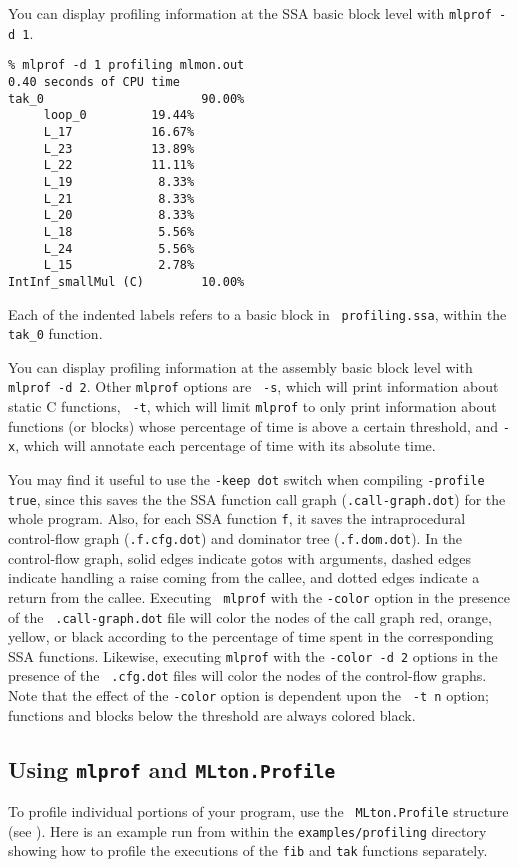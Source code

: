 You can display profiling information at the SSA basic block level
with {\tt mlprof -d 1}.

\begin{verbatim}
% mlprof -d 1 profiling mlmon.out
0.40 seconds of CPU time
tak_0                      90.00%
     loop_0         19.44%       
     L_17           16.67%       
     L_23           13.89%       
     L_22           11.11%       
     L_19            8.33%       
     L_21            8.33%       
     L_20            8.33%       
     L_18            5.56%       
     L_24            5.56%       
     L_15            2.78%       
IntInf_smallMul (C)        10.00%
\end{verbatim}
Each of the indented labels refers to a basic block in {\tt
  profiling.ssa}, within the {\tt tak\_0} function.

You can display profiling information at the assembly basic block
level with {\tt mlprof -d 2}.  Other {\tt mlprof} options are {\tt
  -s}, which will print information about static C functions, {\tt
  -t}, which will limit {\tt mlprof} to only print information about
functions (or blocks) whose percentage of time is above a certain
threshold, and {\tt -x}, which will annotate each percentage of time
with its absolute time.

You may find it useful to use the {\tt -keep dot} switch when
compiling {\tt -profile true}, since this saves the the SSA function
call graph ({\tt .call-graph.dot}) for the whole program.  Also, for
each SSA function {\tt f}, it saves the intraprocedural control-flow
graph ({\tt .f.cfg.dot}) and dominator tree ({\tt .f.dom.dot}).  In
the control-flow graph, solid edges indicate gotos with arguments,
dashed edges indicate handling a raise coming from the callee, and
dotted edges indicate a return from the callee.  Executing {\tt
mlprof} with the {\tt -color} option in the presence of the {\tt
.call-graph.dot} file will color the nodes of the call graph red,
orange, yellow, or black according to the percentage of time spent in
the corresponding SSA functions.  Likewise, executing {\tt mlprof}
with the {\tt -color -d 2} options in the presence of the {\tt
.cfg.dot} files will color the nodes of the control-flow graphs.  Note
that the effect of the {\tt -color} option is dependent upon the {\tt
-t n} option; functions and blocks below the threshold are always
colored black.

\subsection{Using {\tt mlprof} and {\tt MLton.Profile}}
To profile individual portions of your program, use the {\tt
MLton.Profile} structure (see ).
Here is an example run from within the {\tt examples/profiling}
directory showing how to profile the executions of the {\tt fib} and
{\tt tak} functions separately.


